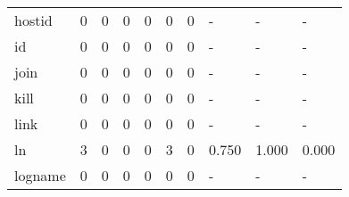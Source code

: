 \begin{longtable}{lp{1.3cm}p{1.3cm}p{1.3cm}p{1.3cm}p{1.3cm}p{1.3cm}p{1.3cm}p{1.3cm}p{1.3cm}}
hostid    &                      0 &                                             0 &                                            0 &                                           0 &                                            0 &                                          0 &                                    - &                                      - &                                    - \\
id        &                      0 &                                             0 &                                            0 &                                           0 &                                            0 &                                          0 &                                    - &                                      - &                                    - \\
join      &                      0 &                                             0 &                                            0 &                                           0 &                                            0 &                                          0 &                                    - &                                      - &                                    - \\
kill      &                      0 &                                             0 &                                            0 &                                           0 &                                            0 &                                          0 &                                    - &                                      - &                                    - \\
link      &                      0 &                                             0 &                                            0 &                                           0 &                                            0 &                                          0 &                                    - &                                      - &                                    - \\
ln        &                      3 &                                             0 &                                            0 &                                           0 &                                            3 &                                          0 &                                0.750 &                                  1.000 &                                0.000 \\
logname   &                      0 &                                             0 &                                            0 &                                           0 &                                            0 &                                          0 &                                    - &                                      - &                                    - \\

\end{longtable}
